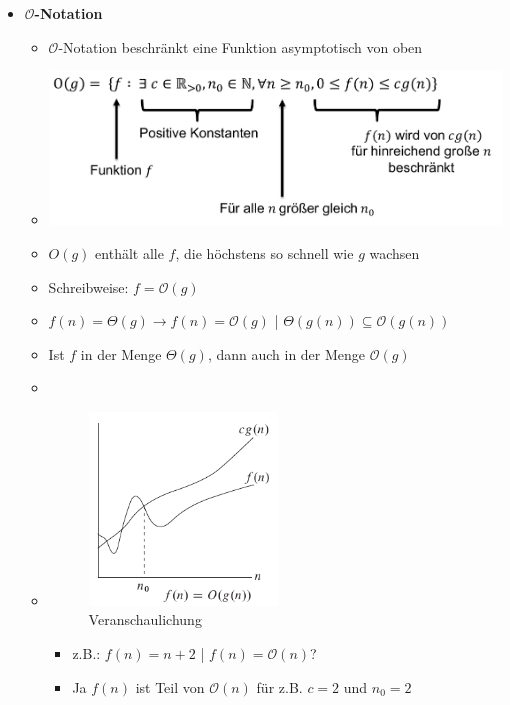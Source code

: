 \documentclass[
    12pt,
    a4paper,
    ngerman,
    color=3b,%
    marginpar=false,
    colorback=false,
    leqno,
]{tudaexercise}
\begin{document}
\begin{itemize}
    \item \textbf{$\mathcal{O}$-Notation}
          \begin{itemize}
              \item $\mathcal{O}$-Notation beschränkt eine Funktion asymptotisch von oben
              \item[] \includegraphics[width=12cm]{pictures/oNotation.pdf}
              \item $O(g)$ enthält alle $f$, die höchstens so schnell wie $g$ wachsen
              \item Schreibweise: $f=\mathcal{O}(g)$
              \item $f(n)=\Theta(g) \rightarrow f(n) = \mathcal{O}(g)$ | $\Theta(g(n)) \subseteq \mathcal{O}(g(n))$
              \item Ist $f$ in der Menge $\Theta(g)$, dann auch in der Menge $\mathcal{O}(g)$
              \item[]
              \item[]
                    \begin{minipage}{0.3\textwidth}
                        \begin{figure}[H]
                            \centering
                            \includegraphics[width=5cm]{pictures/oNotationGraph.pdf}
                            \caption{Veranschaulichung}
                            \label{}
                        \end{figure}
                    \end{minipage}
                    \begin{minipage}[t]{0.6\textwidth}
                        \vspace{-3cm}
                        \begin{itemize}
                            \item z.B.: $f(n) = n + 2$ | $f(n) = \mathcal{O}(n)$?
                            \item Ja $f(n)$ ist Teil von $\mathcal{O}(n)$ für z.B. $c = 2$ und $n_0 = 2$
                        \end{itemize}
                    \end{minipage}
          \end{itemize}


\end{itemize}
\end{document}
